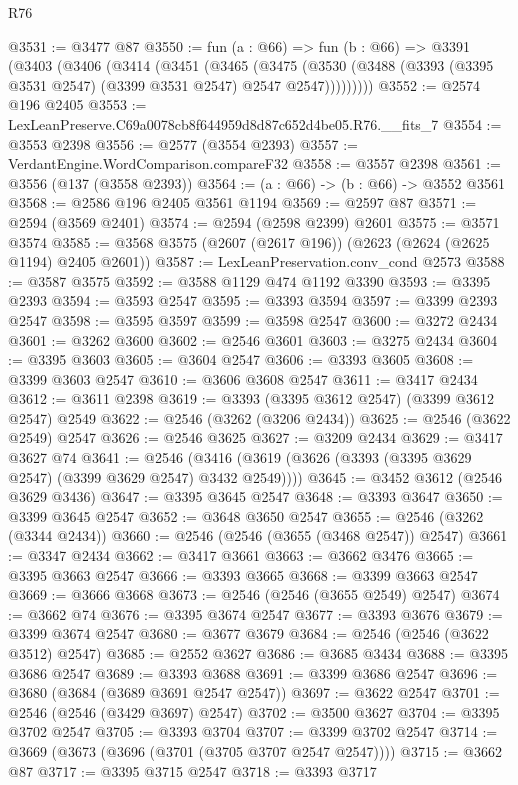\begin{lexlean}{R76}
\begin{coremodule}
@3531 := @3477 @87
@3550 := fun (a : @66) =>
  fun (b : @66) =>
  @3391
    (@3403
      (@3406
        (@3414
          (@3451
            (@3465
              (@3475
                (@3530 (@3488 (@3393 (@3395 @3531 @2547) (@3399 @3531 @2547) @2547 @2547)))))))))
@3552 := @2574 @196 @2405
@3553 := LexLeanPreserve.C69a0078cb8f644959d8d87c652d4be05.R76.__fits_7
@3554 := @3553 @2398
@3556 := @2577 (@3554 @2393)
@3557 := VerdantEngine.WordComparison.compareF32
@3558 := @3557 @2398
@3561 := @3556 (@137 (@3558 @2393))
@3564 := (a : @66) -> (b : @66) -> @3552 @3561
@3568 := @2586 @196 @2405 @3561 @1194
@3569 := @2597 @87
@3571 := @2594 (@3569 @2401)
@3574 := @2594 (@2598 @2399) @2601
@3575 := @3571 @3574
@3585 := @3568 @3575 (@2607 (@2617 @196)) (@2623 (@2624 (@2625 @1194) @2405 @2601))
@3587 := LexLeanPreservation.conv_cond @2573
@3588 := @3587 @3575
@3592 := @3588 @1129 @474 @1192 @3390
@3593 := @3395 @2393
@3594 := @3593 @2547
@3595 := @3393 @3594
@3597 := @3399 @2393 @2547
@3598 := @3595 @3597
@3599 := @3598 @2547
@3600 := @3272 @2434
@3601 := @3262 @3600
@3602 := @2546 @3601
@3603 := @3275 @2434
@3604 := @3395 @3603
@3605 := @3604 @2547
@3606 := @3393 @3605
@3608 := @3399 @3603 @2547
@3610 := @3606 @3608 @2547
@3611 := @3417 @2434
@3612 := @3611 @2398
@3619 := @3393 (@3395 @3612 @2547) (@3399 @3612 @2547) @2549
@3622 := @2546 (@3262 (@3206 @2434))
@3625 := @2546 (@3622 @2549) @2547
@3626 := @2546 @3625
@3627 := @3209 @2434
@3629 := @3417 @3627 @74
@3641 := @2546 (@3416 (@3619 (@3626 (@3393 (@3395 @3629 @2547) (@3399 @3629 @2547) @3432 @2549))))
@3645 := @3452 @3612 (@2546 @3629 @3436)
@3647 := @3395 @3645 @2547
@3648 := @3393 @3647
@3650 := @3399 @3645 @2547
@3652 := @3648 @3650 @2547
@3655 := @2546 (@3262 (@3344 @2434))
@3660 := @2546 (@2546 (@3655 (@3468 @2547)) @2547)
@3661 := @3347 @2434
@3662 := @3417 @3661
@3663 := @3662 @3476
@3665 := @3395 @3663 @2547
@3666 := @3393 @3665
@3668 := @3399 @3663 @2547
@3669 := @3666 @3668
@3673 := @2546 (@2546 (@3655 @2549) @2547)
@3674 := @3662 @74
@3676 := @3395 @3674 @2547
@3677 := @3393 @3676
@3679 := @3399 @3674 @2547
@3680 := @3677 @3679
@3684 := @2546 (@2546 (@3622 @3512) @2547)
@3685 := @2552 @3627
@3686 := @3685 @3434
@3688 := @3395 @3686 @2547
@3689 := @3393 @3688
@3691 := @3399 @3686 @2547
@3696 := @3680 (@3684 (@3689 @3691 @2547 @2547))
@3697 := @3622 @2547
@3701 := @2546 (@2546 (@3429 @3697) @2547)
@3702 := @3500 @3627
@3704 := @3395 @3702 @2547
@3705 := @3393 @3704
@3707 := @3399 @3702 @2547
@3714 := @3669 (@3673 (@3696 (@3701 (@3705 @3707 @2547 @2547))))
@3715 := @3662 @87
@3717 := @3395 @3715 @2547
@3718 := @3393 @3717

\end{coremodule}
\end{lexlean}
